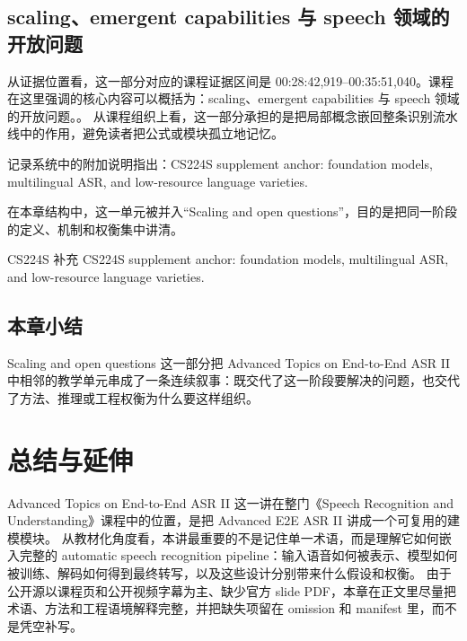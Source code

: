 \documentclass[a4paper]{article}
\begin{document}
\subsection{scaling、emergent capabilities 与 speech 领域的开放问题}
从证据位置看，这一部分对应的课程证据区间是 00:28:42,919--00:35:51,040。课程在这里强调的核心内容可以概括为：scaling、emergent capabilities 与 speech 领域的开放问题。。
从课程组织上看，这一部分承担的是把局部概念嵌回整条识别流水线中的作用，避免读者把公式或模块孤立地记忆。

记录系统中的附加说明指出：CS224S supplement anchor: foundation models, multilingual ASR, and low-resource language varieties.

在本章结构中，这一单元被并入“Scaling and open questions”，目的是把同一阶段的定义、机制和权衡集中讲清。
\begin{knowledgebox}{CS224S 补充}
CS224S supplement anchor: foundation models, multilingual ASR, and low-resource language varieties.
\end{knowledgebox}

\subsection{本章小结}
Scaling and open questions 这一部分把 Advanced Topics on End-to-End ASR II 中相邻的教学单元串成了一条连续叙事：既交代了这一阶段要解决的问题，也交代了方法、推理或工程权衡为什么要这样组织。

\section{总结与延伸}
Advanced Topics on End-to-End ASR II 这一讲在整门《Speech Recognition and Understanding》课程中的位置，是把 Advanced E2E ASR II 讲成一个可复用的建模模块。
从教材化角度看，本讲最重要的不是记住单一术语，而是理解它如何嵌入完整的 automatic speech recognition pipeline：输入语音如何被表示、模型如何被训练、解码如何得到最终转写，以及这些设计分别带来什么假设和权衡。
由于公开源以课程页和公开视频字幕为主、缺少官方 slide PDF，本章在正文里尽量把术语、方法和工程语境解释完整，并把缺失项留在 omission 和 manifest 里，而不是凭空补写。
\end{document}
